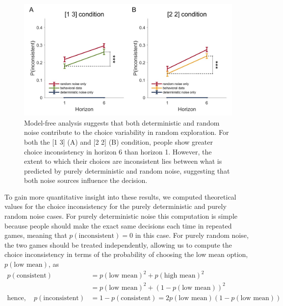 \documentclass[12pt]{article}
\begin{document}
{\begin{figure}[H]
	\begin{center}
		\includegraphics[width=\textwidth]{figures/RanDetNoise_pinconsistent.jpg}
		\caption{Model-free analysis suggests that both deterministic and random noise contribute to the choice variability in random exploration. For both the [1 3] (A) and [2 2] (B) condition, people show greater choice inconsistency in horizon 6 than horizon 1. However, the extent to which their choices are inconsistent lies between what is predicted by purely deterministic and random noise, suggesting that both noise sources influence the decision.}
		\label{fig:mf2}
	\end{center}
\end{figure}

To gain more quantitative insight into these results, we computed theoretical values for the choice inconsistency for the purely deterministic and purely random noise cases.  For purely deterministic noise this computation is simple because people should make the exact same decisions each time in repeated games, meaning that $p(\mbox{inconsistent}) = 0$ in this case. For purely random noise, the two games should be treated independently, allowing us to compute the choice inconsistency in terms of the probability of choosing the low mean option, $p(\mbox{low mean})$, as
\begin{equation*}
	\begin{split}
		p(\mbox{consistent}) &= p(\mbox{low mean})^2 + p(\mbox{high mean})^2\\
		&= p(\mbox{low mean})^2 + (1-p(\mbox{low mean}))^2\\ 
		\mbox{hence},\quad p(\mbox{inconsistent}) &=  
		1 - p(\mbox{consistent}) = 
		2 p(\mbox{low mean})(1-p(\mbox{low mean}))
	\end{split}
\end{equation*}

}
\end{document}

